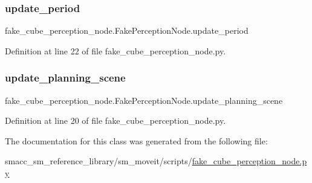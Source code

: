 \subsubsection{\texorpdfstring{update\+\_\+period}{update\_period}}
{\footnotesize\ttfamily fake\+\_\+cube\+\_\+perception\+\_\+node.\+Fake\+Perception\+Node.\+update\+\_\+period}



Definition at line 22 of file fake\+\_\+cube\+\_\+perception\+\_\+node.\+py.

\mbox{\label{classfake__cube__perception__node_1_1FakePerceptionNode_a67b87c9f077aefedf69f3e6d9b29ea94}} 
\subsubsection{\texorpdfstring{update\+\_\+planning\+\_\+scene}{update\_planning\_scene}}
{\footnotesize\ttfamily fake\+\_\+cube\+\_\+perception\+\_\+node.\+Fake\+Perception\+Node.\+update\+\_\+planning\+\_\+scene}



Definition at line 20 of file fake\+\_\+cube\+\_\+perception\+\_\+node.\+py.



The documentation for this class was generated from the following file\+:\begin{DoxyCompactItemize}
\item 
smacc\+\_\+sm\+\_\+reference\+\_\+library/sm\+\_\+moveit/scripts/\hyperlink{fake__cube__perception__node_8py}{fake\+\_\+cube\+\_\+perception\+\_\+node.\+py}\end{DoxyCompactItemize}
